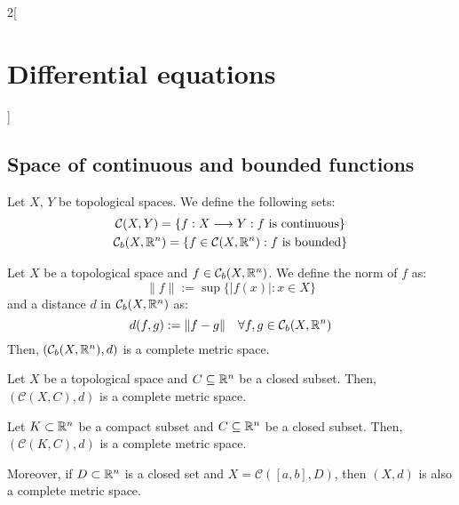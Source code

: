 \documentclass[../../../main.tex]{subfiles}
\begin{document}
\begin{multicols}{2}[\section{Differential equations}]
  \subsection{Space of continuous and bounded functions}
  \begin{definition}
    Let $X$, $Y$ be topological spaces. We define the following sets:
    \begin{gather*}
      \mathcal{C}(X,Y)=\{f:X\longrightarrow Y:f\text{ is continuous}\}\\
      \mathcal{C}_b(X,\mathbb{R}^n)=\{f\in\mathcal{C}(X,\mathbb{R}^n):f\text{ is bounded}\}
    \end{gather*}
  \end{definition}
  \begin{theorem}
    Let $X$ be a topological space and $f\in\mathcal{C}_b(X,\mathbb{R}^n)$. We define the norm of $f$ as: $$\|f\|:=\sup\{|f(x)|:x\in X\}$$ and a distance $d$ in $\mathcal{C}_b(X,\mathbb{R}^n)$ as: $$d(f,g):=\|f-g\|\quad\forall f,g\in\mathcal{C}_b(X,\mathbb{R}^n)$$
    Then, $(\mathcal{C}_b(X,\mathbb{R}^n),d)$ is a complete metric space.
  \end{theorem}
  \begin{theorem}
    Let $X$ be a topological space and $C\subseteq\mathbb{R}^n$ be a closed subset. Then, $(\mathcal{C}(X,C),d)$ is a complete metric space.
  \end{theorem}
  \begin{corollary}
    Let $K\subset \mathbb{R}^n$ be a compact subset and $C\subseteq\mathbb{R}^n$ be a closed subset. Then, $(\mathcal{C}(K,C),d)$ is a complete metric space.
  \end{corollary}
  \begin{corollary}
    Moreover, if $D\subset\mathbb{R}^n$ is a closed set and $X=\mathcal{C}([a,b],D)$, then $(X,d)$ is also a complete metric space.
  \end{corollary}

\end{multicols}
\end{document}
